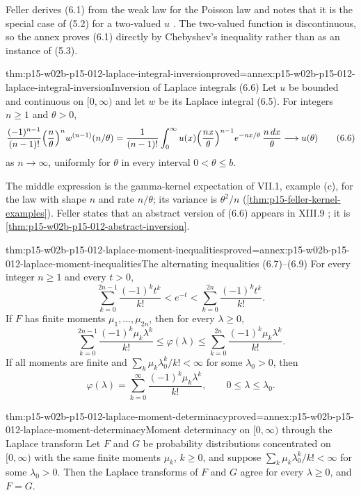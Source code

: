 Feller derives (6.1) from the weak law for the Poisson law and notes that it
is the special case of (5.2) for a two-valued \(u\)
\cite[vol.~II, VII.6, p.~232]{Feller1971ProbabilityII}. The two-valued
function is discontinuous, so the annex proves (6.1) directly by Chebyshev's
inequality rather than as an instance of (5.3).

\begin{hbtheorem}{thm:p15-w02b-p15-012-laplace-integral-inversion}{proved=annex:p15-w02b-p15-012-laplace-integral-inversion}{Inversion of Laplace integrals (6.6)}
Let \(u\) be bounded and continuous on \([0,\infty)\) and let \(w\) be its
Laplace integral (6.5). For integers \(n\geq1\) and \(\theta>0\),
\[
 \frac{(-1)^{n-1}}{(n-1)!}\Bigl(\frac n\theta\Bigr)^n w^{(n-1)}(n/\theta)
   =\frac1{(n-1)!}\int_0^\infty u(x)\Bigl(\frac{nx}\theta\Bigr)^{n-1}
          e^{-nx/\theta}\,\frac{n\,dx}\theta
   \longrightarrow u(\theta)
 \tag{6.6}
\]
as \(n\to\infty\), uniformly for \(\theta\) in every interval \(0<\theta\leq b\).
\end{hbtheorem}

The middle expression is the gamma-kernel expectation of VII.1, example (c),
for the law with shape \(n\) and rate \(n/\theta\); its variance is
\(\theta^2/n\) (\cref{thm:p15-feller-kernel-examples}). Feller states that an
abstract version of (6.6) appears in XIII.9
\cite[vol.~II, VII.6, p.~233]{Feller1971ProbabilityII}; it is
\cref{thm:p15-w02b-p15-012-abstract-inversion}.

\begin{hbtheorem}{thm:p15-w02b-p15-012-laplace-moment-inequalities}{proved=annex:p15-w02b-p15-012-laplace-moment-inequalities}{The alternating inequalities (6.7)--(6.9)}
For every integer \(n\geq1\) and every \(t>0\),
\[
 \sum_{k=0}^{2n-1}\frac{(-1)^kt^k}{k!}<e^{-t}<\sum_{k=0}^{2n}\frac{(-1)^kt^k}{k!}.
 \tag{6.8}
\]
If \(F\) has finite moments \(\mu_1,\ldots,\mu_{2n}\), then for every
\(\lambda\geq0\),
\[
 \sum_{k=0}^{2n-1}\frac{(-1)^k\mu_k\lambda^k}{k!}
   \leq\varphi(\lambda)\leq
 \sum_{k=0}^{2n}\frac{(-1)^k\mu_k\lambda^k}{k!}.
 \tag{6.7}
\]
If all moments are finite and \(\sum_k\mu_k\lambda_0^k/k!<\infty\) for some
\(\lambda_0>0\), then
\[
 \varphi(\lambda)=\sum_{k=0}^\infty\frac{(-1)^k\mu_k\lambda^k}{k!},
 \qquad0\leq\lambda\leq\lambda_0 .
 \tag{6.9}
\]
\end{hbtheorem}

\begin{hbtheorem}{thm:p15-w02b-p15-012-laplace-moment-determinacy}{proved=annex:p15-w02b-p15-012-laplace-moment-determinacy}{Moment determinacy on \([0,\infty)\) through the Laplace transform}
Let \(F\) and \(G\) be probability distributions concentrated on
\([0,\infty)\) with the same finite moments \(\mu_k\), \(k\geq0\), and
suppose \(\sum_k\mu_k\lambda_0^k/k!<\infty\) for some \(\lambda_0>0\).
Then the Laplace transforms of \(F\) and \(G\) agree for every
\(\lambda\geq0\), and \(F=G\).
\end{hbtheorem}

